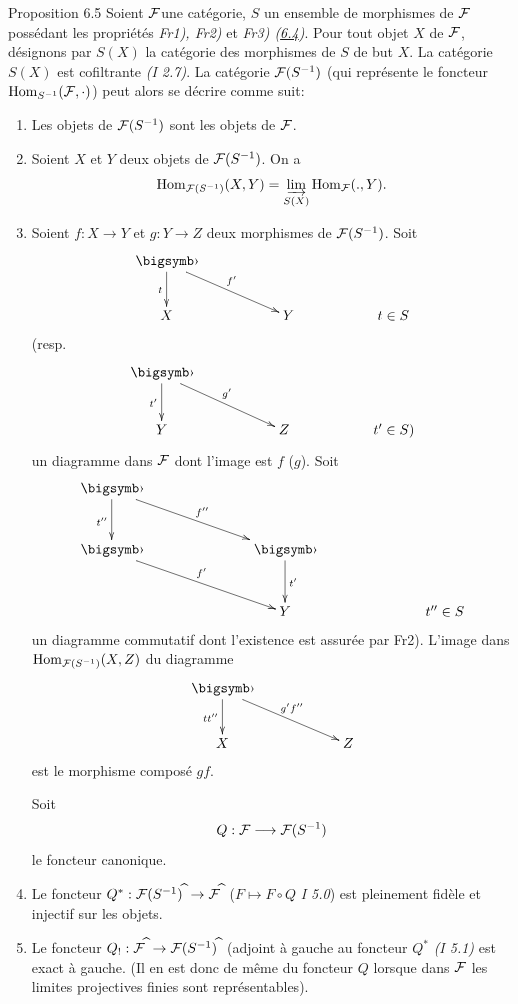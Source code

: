 \documentclass[10pt]{../fichiers-configuration-latex/smfart}
\begin{document}
\begin{enonce*}{Proposition 6.5}
Soient ${\mathcal F}$\pageoriginale une catégorie, $S$ un ensemble de
morphismes de ${\mathcal F}$ possédant les propriétés \emph{Fr1), Fr2)} et \emph{Fr3)
  (\hyperref[VI.prop6.4]{6.4})}. Pour tout objet $X$ de ${\mathcal F}$, désignons par $S(X)$ la catégorie des
morphismes de $S$ de but $X$. La catégorie $S(X)$ est cofiltrante \emph{(I
2.7)}. La catégorie ${\mathcal F}(S^{-1})$ (qui représente le foncteur
$\operatorname{Hom}_{S^{-1}} ({\mathcal F}, \cdot)$) peut alors se décrire comme suit:
\begin{enumerate}
\renewcommand{\theenumi}{\alph{enumi}}
\renewcommand{\labelenumi}{\theenumi)}
\item Les objets de ${\mathcal F} (S^{-1})$ sont les objets de
  ${\mathcal F}$.

\item Soient $X$ et $Y$ deux objets de ${\mathcal F}(S^{-1})$. On a
$$
\operatorname{Hom}_{{\mathcal F}(S^{-1})} (X, Y)= \varinjlim_{S(X)}
\operatorname{Hom}_{{\mathcal F}} (., Y){}.
$$

\item Soient $f : X \to Y$ et $g : Y \to Z$ deux morphismes de
  ${\mathcal F}(S^{-1})$.
Soit
\[
\xymatrix{
\bigdot  \ar[d]_{t} \ar[rrd]^{f'}&\\
X        & &Y & & t\in S
}
\]
(resp.
\[
\xymatrix{
\bigdot \ar[d]_{t'} \ar[rrd]^{g'}&\\
Y                          & & Z & & t'\in S)
}
\]
un diagramme dans ${\mathcal F}$ dont l'image est $f$ (\resp $g$). Soit
\[
\xymatrix@C=2.5cm@R=1cm{
\bigdot \ar[rd]^{f''} \ar[d]_{t''}& \\
\bigdot \ar[rd]^{f'}        & \bigdot \ar[d]^{t'}\\
                            & Y      & t''\in S
}
\]
un diagramme commutatif dont l'existence est assurée par
Fr2). L'image dans $\operatorname{Hom}_{{\mathcal F}(S^{-1})} (X, Z)$ du diagramme
\[
\xymatrix@C=2cm{
\bigdot \ar[d]_{tt''} \ar[rd]^{g'f''}& \\
X       & Z
}
\]
est le morphisme composé $gf$.

Soit\pageoriginale
$$
Q : \Ff \to \Ff (S^{-1})
$$
le foncteur canonique.

\item Le foncteur $Q^{\ast} : \Ff(S^{-1})^{\widehat{\phantom{,}}} \to
  \Ff^{\widehat{\phantom{,}}}$ ($F \mapsto F \circ Q$ \emph{I
  5.0}) est pleinement
  fidèle et injectif sur les objets.

\item Le foncteur $Q_{!} : \Ff^{\widehat{\phantom{,}}} \to
  \Ff(S^{-1})^{\widehat{\phantom{,}}}$ (adjoint à gauche au foncteur
  $Q^{\ast}$ \emph{(I 5.1)} est exact à gauche. (Il en est donc de même du
  foncteur $Q$ lorsque dans ${\mathcal F}$ les limites projectives
  finies sont représentables).
\end{enumerate}
\end{enonce*}
\end{document}
